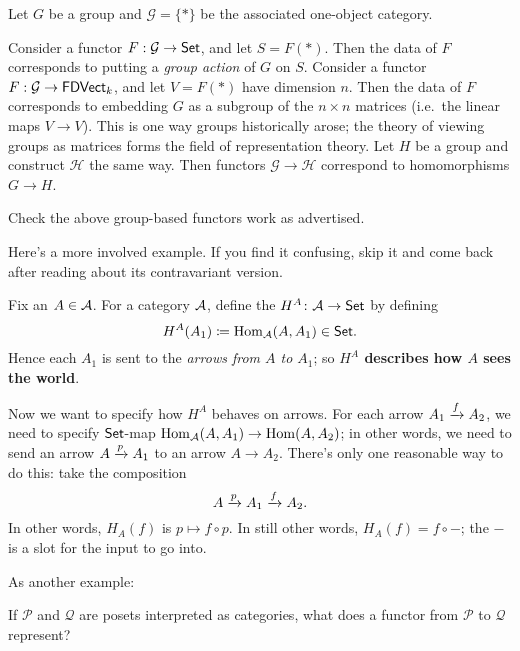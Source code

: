 \begin{example}
	Let $G$ be a group and $\mathcal G = \{\ast\}$ be the associated one-object category.
	\begin{enumerate}[(a)]
		\ii Consider a functor $F : \mathcal G \to \catname{Set}$, and let $S = F(\ast)$.
		Then the data of $F$ corresponds to putting a \emph{group action} of $G$ on $S$.
		\ii Consider a functor $F : \mathcal G \to \catname{FDVect}_k$, and let $V = F(\ast)$ have dimension $n$.
		Then the data of $F$ corresponds to embedding $G$ as a subgroup of the $n \times n$ matrices
		(i.e.\ the linear maps $V \to V$).
		This is one way groups historically arose; the theory of viewing groups as matrices
		forms the field of representation theory.
		\ii Let $H$ be a group and construct $\mathcal H$ the same way.
		Then functors $\mathcal G \to \mathcal H$ correspond to homomorphisms $G \to H$.
	\end{enumerate}
\end{example}
\begin{exercise}
	Check the above group-based functors work as advertised.
\end{exercise}

Here's a more involved example.
If you find it confusing,
skip it and come back after reading about its contravariant version.
\begin{example}
	\label{ex:covariant_yoneda}
	Fix an $A \in \AA$.
	For a category $\AA$, define the
	 $H^A \colon \AA \to \catname{Set}$
	by defining \[ H^A(A_1) \defeq \Hom_\AA (A, A_1) \in \catname{Set}. \]
	Hence each $A_1$ is sent to the \emph{arrows from $A$ to $A_1$};
	so \textbf{$H^A$ describes how $A$ sees the world}.

	Now we want to specify how $H^A$ behaves on arrows.
	For each arrow $A_1 \taking{f} A_2$, we need
	to specify $\catname{Set}$-map $\Hom_\AA (A, A_1) \to \Hom(A, A_2)$;
	in other words, we need to send an arrow $A \taking{p} A_1$ to an arrow $A \to A_2$.
	There's only one reasonable way to do this: take the composition
	\[ A \taking{p} A_1 \taking{f} A_2. \]
	In other words, $H_A(f)$ is $p \mapsto f \circ p$.
	In still other words, $H_A(f) = f \circ -$;
	the $-$ is a slot for the input to go into.
\end{example}

As another example:
\begin{ques}
	If $\mathcal P$ and $\mathcal Q$ are posets interpreted as categories,
	what does a functor from $\mathcal P$ to $\mathcal Q$ represent?
\end{ques}

